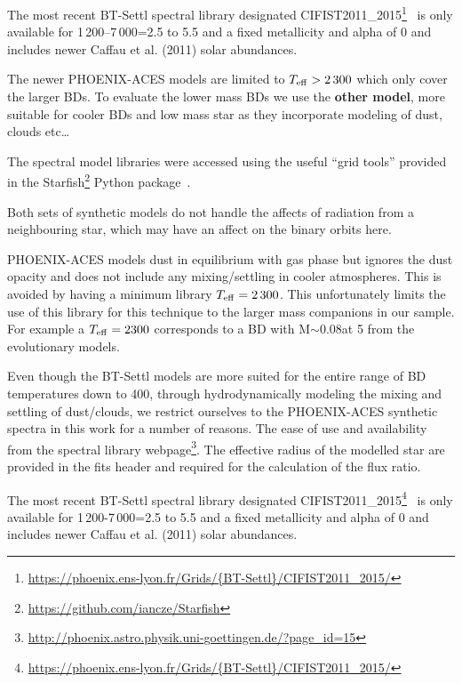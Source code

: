 The most recent {BT-Settl} spectral library designated CIFIST2011\_2015\footnote{\url{https://phoenix.ens-lyon.fr/Grids/{BT-Settl}/CIFIST2011_2015/}}~\citep{baraffe_new_2015} is only available for 1\,200--7\,000\K{}\logg{}=2.5 to 5.5 and a fixed metallicity and alpha of 0 and includes newer Caffau et al. (2011) solar abundances.

The newer {PHOENIX-ACES} models are limited to \(T_{\mathrm{eff}}{}> 2\,300\)\K{} which only cover the larger BDs.
To evaluate the lower mass BDs we use the \textbf{other model}, more suitable for cooler BDs and low mass star as they incorporate modeling of dust, clouds etc\ldots


The spectral model libraries were accessed using the useful ``grid tools'' provided in the Starfish\footnote{\url{https://github.com/iancze/Starfish}} Python package~\citep{czekala_constructing_2015}.


Both sets of synthetic models do not handle the affects of radiation from a neighbouring star, which may have an affect on the binary orbits here.



{PHOENIX-ACES} models dust in equilibrium with gas phase but ignores the dust opacity and does not include any mixing/settling in cooler atmospheres.
This is avoided by having a minimum library \(T_{\mathrm{eff}}{}=2\,300\)\K{}.
This unfortunately limits the use of this library for this technique to the larger mass companions in our sample.
For example a \(T_{\mathrm{eff}}{}=2300\)\K{} corresponds to a {BD} with M\(\sim0.08\)\Modot at 5\Gyr{} from the~\citet{baraffe_evolutionary_2003} evolutionary models.


Even though the {BT-Settl} models are more suited for the entire range of {BD} temperatures down to 400\K{}, through hydrodynamically modeling the mixing and settling of dust/clouds, we restrict ourselves to the {PHOENIX-ACES} synthetic spectra in this work for a number of reasons.
The ease of use and availability from the spectral library webpage\footnote{\url{http://phoenix.astro.physik.uni-goettingen.de/?page_id=15}}.
The effective radius of the modelled star are provided in the fits header and required for the calculation of the flux ratio.



The most recent {BT-Settl} spectral library designated CIFIST2011\_2015\footnote{\url{https://phoenix.ens-lyon.fr/Grids/{BT-Settl}/CIFIST2011_2015/}}~\citep{baraffe_new_2015} is only available for 1\,200-7\,000\K{}\logg{}=2.5 to 5.5 and a fixed metallicity and alpha of 0 and includes newer Caffau et al. (2011) solar abundances.

